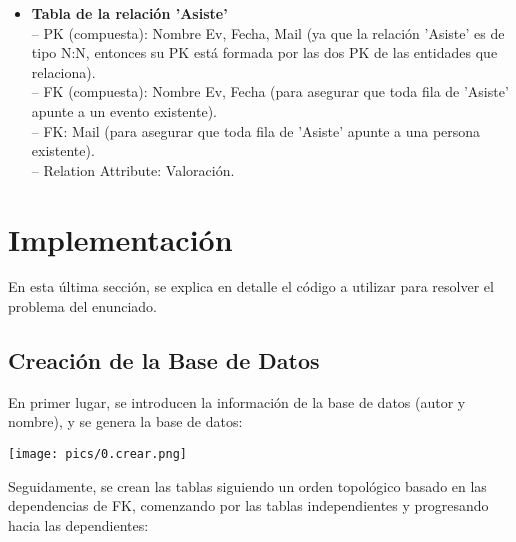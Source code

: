 \documentclass[12pt]{article}
\begin{document}
\begin{itemize}
        \item \textbf{Tabla de la relación 'Asiste'} \\
            -- PK (compuesta): Nombre Ev, Fecha, Mail (ya que la relación 'Asiste' es de tipo N:N, entonces su PK está formada por las dos PK de las 
            entidades que relaciona). \\
            -- FK (compuesta): Nombre Ev, Fecha (para asegurar que toda fila de 'Asiste' apunte a un evento existente). \\
            -- FK: Mail (para asegurar que toda fila de 'Asiste' apunte a una persona existente). \\
            -- Relation Attribute: Valoración.

    \end{itemize}

    \newpage
    \section{Implementación}
    En esta última sección, se explica en detalle el código a utilizar para resolver el problema del enunciado. 
    
    \subsection{Creación de la Base de Datos}    
    En primer lugar, se introducen la información de la base de datos (autor y nombre), y se genera la base de datos:

    \begin{center}{\texttt{[image: pics/0.crear.png]}}\end{center} 

    Seguidamente, se crean las tablas siguiendo un orden topológico basado en las dependencias de FK, 
    comenzando por las tablas independientes y progresando hacia las dependientes:
    
\end{document}
